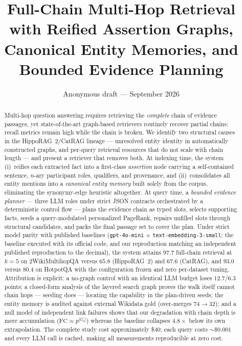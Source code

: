 \documentclass[11pt,a4paper]{article}
\title{Full-Chain Multi-Hop Retrieval with Reified Assertion Graphs,\\
Canonical Entity Memories, and Bounded Evidence Planning}
\author{Anonymous draft --- September 2026}
\date{}
\newcommand{\hippo}{HippoRAG~2}
\begin{document}
\maketitle

\begin{abstract}
Multi-hop question answering requires retrieving the \emph{complete} chain of
evidence passages, yet state-of-the-art graph-based retrievers routinely
recover partial chains: recall metrics remain high while the chain is broken.
We identify two structural causes in the HippoRAG~2/CatRAG lineage ---
unresolved entity identity in automatically constructed graphs, and per-query
retrieval resources that do not scale with chain length --- and present a
retriever that removes both. At indexing time, the system (i)~reifies each
extracted fact into a first-class \emph{assertion} node carrying a
self-contained sentence, $n$-ary participant roles, qualifiers, and
provenance, and (ii)~consolidates all entity mentions into a \emph{canonical
entity memory} built solely from the corpus, eliminating the synonymy-edge
heuristic altogether. At query time, a \emph{bounded evidence planner} ---
three LLM roles under strict JSON contracts orchestrated by a deterministic
control flow --- plans the evidence chain as typed slots, selects supporting
facts, seeds a query-modulated personalized PageRank, repairs unfilled slots
through structural candidates, and packs the final passage set to cover the
plan. Under strict model parity with published baselines (\texttt{gpt-4o-mini}
$+$ \texttt{text-embedding-3-small}; the baseline executed with its official
code, and our reproduction matching an independent published reproduction to
the decimal), the system attains $97.7$ full-chain retrieval at $k{=}5$ on
2WikiMultihopQA versus $65.8$ (\hippo{}) and $67.6$ (CatRAG), and $93.0$
versus $80.4$ on HotpotQA with the configuration frozen and zero per-dataset
tuning. Attribution is explicit: a no-graph control with an identical LLM
budget loses $12.7$/$6.3$ points; a closed-form analysis of the layered
search graph proves the walk itself cannot chain hops --- seeding does ---
locating the capability in the plan-driven seeds; the entity memory is
audited against external Wikidata gold (over-merges $74\to32$); and a null
model of independent link failures shows that our degradation with chain depth is mere accumulation
($\mathrm{FC}\!\approx\!p^{|G_q|}$) whereas the baseline collapses $4.8\times$
below its own extrapolation. The complete study cost approximately
\$40; each query costs ${\sim}\$0.001$ and every LLM call is cached, making
all measurements reproducible at zero cost.
\end{abstract}
\end{document}
